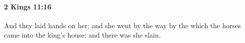 
		\paragraph{2 Kings 11:16} %
			\label{2KINGS-11-16}

			And they laid hands on her; and she went by the way by the which the horses came into the king’s house: and there was she slain.



